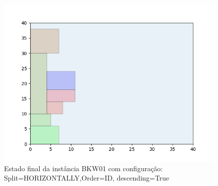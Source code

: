 \begin{figure}[H]
    \centering
    \caption[]{Estado final da instância BKW01 com configuração: Split=HORIZONTALLY,Order=ID, descending=True}
    \label{fig:bkw01-horizontally-id-true}
    \includegraphics[scale=0.5]{output/figures/bkw/bkw01/horizontally/id/true/00}
\end{figure}